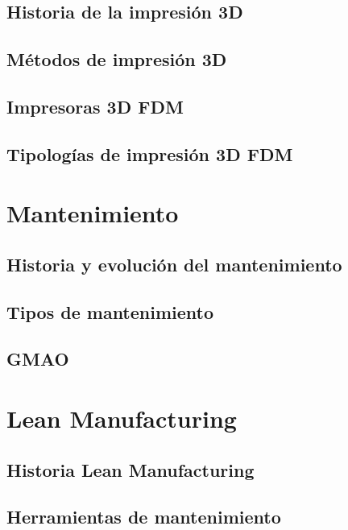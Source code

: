 \subsection{Historia de la impresión 3D}

\subsection{Métodos de impresión 3D}

\subsection{Impresoras 3D FDM}

\subsection{Tipologías de impresión 3D FDM}

\section{Mantenimiento}

\subsection{Historia y evolución del mantenimiento}

\subsection{Tipos de mantenimiento}

\subsection{GMAO}

\section{Lean Manufacturing}

\subsection{Historia Lean Manufacturing}

\subsection{Herramientas de mantenimiento}

